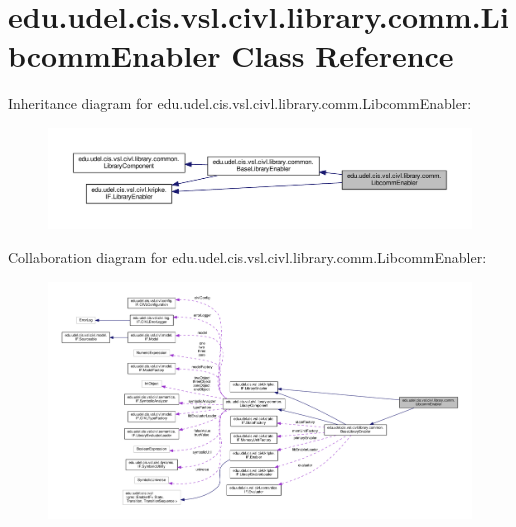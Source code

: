 \hypertarget{classedu_1_1udel_1_1cis_1_1vsl_1_1civl_1_1library_1_1comm_1_1LibcommEnabler}{}\section{edu.\+udel.\+cis.\+vsl.\+civl.\+library.\+comm.\+Libcomm\+Enabler Class Reference}
\label{classedu_1_1udel_1_1cis_1_1vsl_1_1civl_1_1library_1_1comm_1_1LibcommEnabler}


Inheritance diagram for edu.\+udel.\+cis.\+vsl.\+civl.\+library.\+comm.\+Libcomm\+Enabler\+:
\nopagebreak
\begin{figure}[H]
\begin{center}
\leavevmode
\includegraphics[width=350pt]{classedu_1_1udel_1_1cis_1_1vsl_1_1civl_1_1library_1_1comm_1_1LibcommEnabler__inherit__graph}
\end{center}
\end{figure}


Collaboration diagram for edu.\+udel.\+cis.\+vsl.\+civl.\+library.\+comm.\+Libcomm\+Enabler\+:
\nopagebreak
\begin{figure}[H]
\begin{center}
\leavevmode
\includegraphics[width=350pt]{classedu_1_1udel_1_1cis_1_1vsl_1_1civl_1_1library_1_1comm_1_1LibcommEnabler__coll__graph}
\end{center}
\end{figure}
